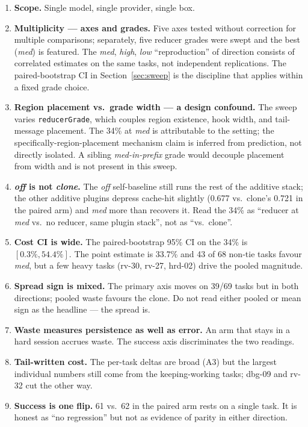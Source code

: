 \documentclass[11pt]{article}
\begin{document}
\begin{enumerate}
\item \textbf{Scope.} Single model, single provider, single box.
\item \textbf{Multiplicity --- axes and grades.} Five axes tested without correction for multiple comparisons; separately, five reducer grades were swept and the best (\emph{med}) is featured. The \emph{med}, \emph{high}, \emph{low} ``reproduction'' of direction consists of correlated estimates on the same tasks, not independent replications. The paired-bootstrap CI in Section~\ref{sec:sweep} is the discipline that applies within a fixed grade choice.
\item \textbf{Region placement vs.\ grade width --- a design confound.} The sweep varies \texttt{reducerGrade}, which couples region existence, hook width, and tail-message placement. The 34\% at \emph{med} is attributable to the setting; the specifically-region-placement mechanism claim is inferred from prediction, not directly isolated. A sibling \emph{med-in-prefix} grade would decouple placement from width and is not present in this sweep.
\item \textbf{\emph{off} is not \emph{clone}.} The \emph{off} self-baseline still runs the rest of the additive stack; the other additive plugins depress cache-hit slightly (0.677 vs.\ clone's 0.721 in the paired arm) and \emph{med} more than recovers it. Read the 34\% as ``reducer at \emph{med} vs.\ no reducer, same plugin stack'', not as ``vs.\ clone''.
\item \textbf{Cost CI is wide.} The paired-bootstrap 95\% CI on the 34\% is $[0.3\%, 54.4\%]$. The point estimate is 33.7\% and 43 of 68 non-tie tasks favour \emph{med}, but a few heavy tasks (rv-30, rv-27, hrd-02) drive the pooled magnitude.
\item \textbf{Spread sign is mixed.} The primary axis moves on 39/69 tasks but in both directions; pooled waste favours the clone. Do not read either pooled or mean sign as the headline --- the spread is.
\item \textbf{Waste measures persistence as well as error.} An arm that stays in a hard session accrues waste. The success axis discriminates the two readings.
\item \textbf{Tail-written cost.} The per-task deltas are broad (A3) but the largest individual numbers still come from the keeping-working tasks; dbg-09 and rv-32 cut the other way.
\item \textbf{Success is one flip.} 61 vs.\ 62 in the paired arm rests on a single task. It is honest as ``no regression'' but not as evidence of parity in either direction.

\end{enumerate}
\end{document}
